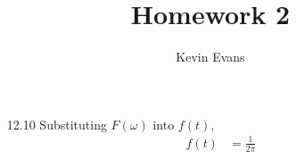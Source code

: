 \documentclass{homework}
\title{Homework 2}
\author{Kevin Evans}
\begin{document}
	\maketitle
	
	\begin{enumerate}
		\item[12.10] Substituting $F(\omega)$ into $f(t)$,
			\begin{align*}
			f(t) & = \frac{1}{2\pi}
			\end{align*}
	\end{enumerate}
\end{document}

